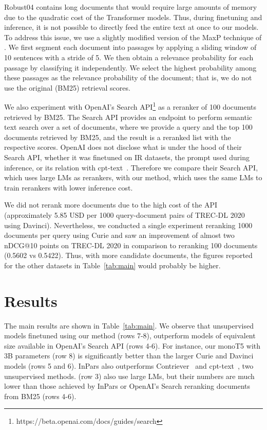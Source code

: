 \documentclass[11pt]{article}
\begin{document}
Robust04 contains long documents that would require large amounts of memory due to the quadratic cost of the Transformer models. Thus, during finetuning and inference, it is not possible to directly feed the entire text at once to our models. To address this issue, we use a slightly modified version of the MaxP technique of \citet{dai2019deeper}. We first segment each document into passages by applying a sliding window of 10 sentences with a stride of 5. We then obtain a relevance probability for each passage by classifying it independently. We select the highest probability among these passages as the relevance probability of the document; that is, we do not use the original (BM25) retrieval scores.

 We also experiment with OpenAI's Search API\footnote{https://beta.openai.com/docs/guides/search} as a reranker of 100 documents retrieved by BM25. The Search API provides an endpoint to perform semantic text search over a set of documents, where we provide a query and the top 100 documents retrieved by BM25, and the result is a reranked list with the respective scores. OpenAI does not disclose what is under the hood of their Search API, whether it was finetuned on IR datasets, the prompt used during inference, or its relation with cpt-text~\cite{neelakantan2022text}. Therefore we compare their Search API, which uses large LMs as rerankers, with our method, which uses the same LMs to train rerankers with lower inference cost.

We did not rerank more documents due to the high cost of the API (approximately 5.85 USD per 1000 query-document pairs of TREC-DL 2020 using Davinci). Nevertheless, we conducted a single experiment reranking 1000 documents per query using Curie and saw an improvement of almost two nDCG@10 points on TREC-DL 2020 in comparison to reranking 100 documents (0.5602 vs 0.5422). Thus, with more candidate documents, the figures reported for the other datasets in Table~\ref{tab:main} would probably be higher.

\section{Results}
\label{sec:results}

The main results are shown in Table~\ref{tab:main}. We observe that unsupervised models finetuned using our method (rows 7-8), outperform models of equivalent size available in OpenAI's Search API (rows 4-6).
For instance, our monoT5 with 3B parameters (row 8) is significantly better than the larger Curie and Davinci models (rows 5 and 6).
InPars also outperforms Contriever~\cite{izacard2021towards} and cpt-text~\cite{neelakantan2022text}, two unsupervised methods.
\citet{neelakantan2022text} (row 3) also use large LMs, but their numbers are much lower than those achieved by InPars or OpenAI's Search reranking documents from BM25 (rows 4-6).
\end{document}
